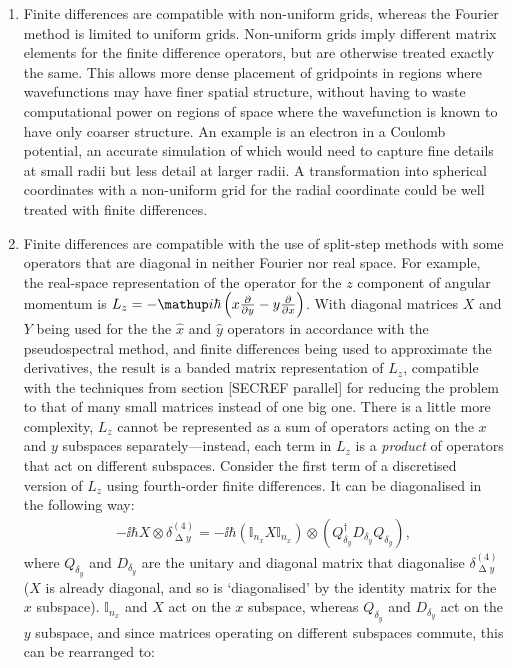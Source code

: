\begin{enumerate}
    \item Finite differences are compatible with non-uniform grids, whereas the Fourier method is limited to uniform grids. Non-uniform grids imply different matrix elements \cite{fornberg_generation_1988} for the finite difference operators, but are otherwise treated exactly the same. This allows more dense placement of gridpoints in regions where wavefunctions may have finer spatial structure, without having to waste computational power on regions of space where the wavefunction is known to have only coarser structure. An example is an electron in a Coulomb potential, an accurate simulation of which would need to capture fine details at small radii but less detail at larger radii. A transformation into spherical coordinates with a non-uniform grid for the radial coordinate could be well treated with finite differences.
    \item Finite differences are compatible with the use of split-step methods with some operators that are diagonal in neither Fourier nor real space. For example, the real-space representation of the operator for the $z$ component of angular momentum is $L_z = -\ii\hbar\left(x\pdv{y} - y \pdv{x}\right)$. With diagonal matrices $X$ and $Y$ being used for the the $\hat x$ and $\hat y$ operators in accordance with the pseudospectral method, and finite differences being used to approximate the derivatives, the result is a banded matrix representation of $L_z$, compatible with the techniques from section [SECREF parallel] for reducing the problem to that of many small matrices instead of one big one. There is a little more complexity, $L_z$ cannot be represented as a sum of operators acting on the $x$ and $y$ subspaces separately---instead, each term in $L_z$ is a \emph{product} of operators that act on different subspaces. Consider the first term of a discretised version of $L_z$ using fourth-order finite differences. It can be diagonalised in the following way:
    \begin{align}
        -\ii\hbar X \otimes \delta^{(4)}_{\upDelta y}
        = -\ii\hbar\left(\mathbb{I}_{n_x} X \mathbb{I}_{n_x}\right)
        \otimes \left(Q_{\delta_y}^\dagger D_{\delta_y}Q_{\delta_y}\right),
    \end{align}
    where $Q_{\delta_y}$ and $D_{\delta_y}$ are the unitary and diagonal matrix that diagonalise $\delta^{(4)}_{\upDelta y}$ ($X$ is already diagonal, and so is `diagonalised' by the identity matrix for the $x$ subspace). $\mathbb{I}_{n_x}$ and $X$ act on the $x$ subspace, whereas $Q_{\delta_y}$ and $D_{\delta_y}$ act on the $y$ subspace, and since matrices operating on different subspaces commute, this can be rearranged to:

\end{enumerate}
